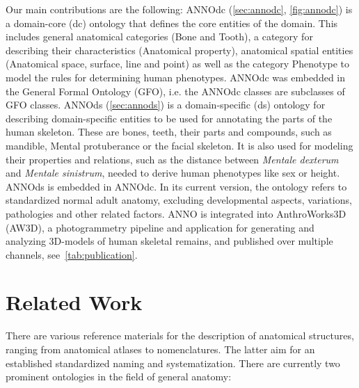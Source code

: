\documentclass[sw]{iosart2x}
\begin{document}
%
Our main contributions are the following:
ANNOdc (\cref{sec:annodc}, \cref{fig:annodc}) is a domain-core (dc) ontology that defines the core entities of the domain.
This includes general anatomical categories (Bone and Tooth), a category for describing their characteristics (Anatomical property), anatomical spatial entities (Anatomical space, surface, line and point) as well as the category Phenotype to model the rules for determining human phenotypes. ANNOdc was embedded in the General Formal Ontology (GFO), i.e. the ANNOdc classes are subclasses of GFO classes.
%
ANNOds (\cref{sec:annods}) is a domain-specific (ds) ontology for describing domain-specific entities to be used for annotating the parts of the human skeleton.
These are bones, teeth, their parts and compounds, such as mandible, Mental protuberance or the facial skeleton.
It is also used for modeling their properties and relations, such as the distance between \emph{Mentale dexterum} and \emph{Mentale sinistrum}, needed to derive human phenotypes like sex or height.
ANNOds is embedded in ANNOdc.
%
In its current version, the ontology refers to standardized normal adult anatomy, excluding developmental aspects, variations, pathologies and other related factors.
ANNO is integrated into AnthroWorks3D (AW3D), a photogrammetry pipeline and application for generating and analyzing 3D-models of human skeletal remains, and published over multiple channels, see~\cref{tab:publication}.

\section{Related Work}\label{sec:relatedwork}

There are various reference materials for the description of anatomical structures, ranging from anatomical atlases to nomenclatures.
The latter aim for an established standardized naming and systematization.
There are currently two prominent ontologies in the field of general anatomy:
\end{document}
